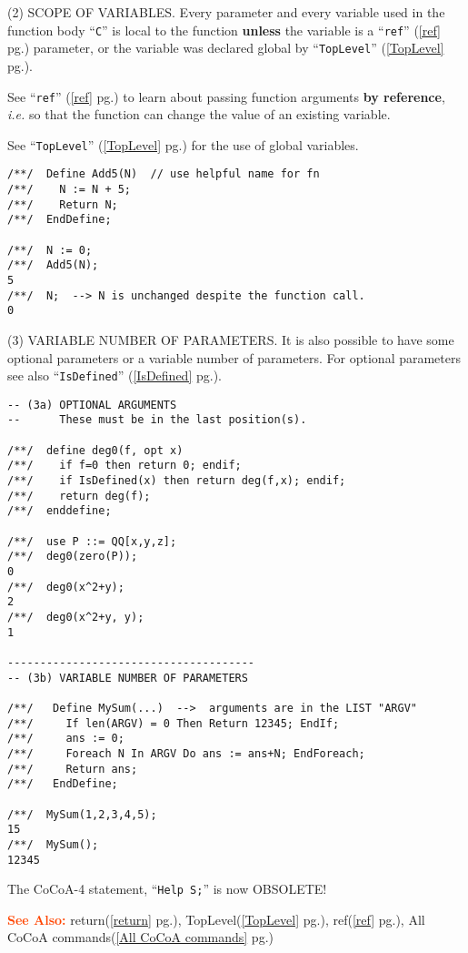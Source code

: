 \documentclass[a4paper]{mybook}
\newenvironment{command}{}{} %
\newcommand\SeeAlso{\par\textcolor{OrangeRed}{\textbf{\large See Also: }}}
\begin{document}
\begin{command}
(2) SCOPE OF VARIABLES.
Every parameter and every variable used in the function body ``\verb&C&'' is
local to the function \textbf{unless} the variable is a ``\verb&ref&'' (\ref{ref} pg.\pageref{ref}) parameter, or
the variable was declared global by ``\verb&TopLevel&'' (\ref{TopLevel} pg.\pageref{TopLevel}).
\par 
See ``\verb&ref&'' (\ref{ref} pg.\pageref{ref}) to learn about passing function arguments \textbf{by reference},
\textit{i.e.} so that the function can change the value of an existing variable.
\par 
See ``\verb&TopLevel&'' (\ref{TopLevel} pg.\pageref{TopLevel}) for the use of global variables.
\begin{Verbatim}[label=example, rulecolor=\color{PineGreen}, frame=single]
/**/  Define Add5(N)  // use helpful name for fn
/**/    N := N + 5;
/**/    Return N;
/**/  EndDefine;

/**/  N := 0;
/**/  Add5(N);
5
/**/  N;  --> N is unchanged despite the function call.
0
\end{Verbatim}


(3) VARIABLE NUMBER OF PARAMETERS.
It is also possible to have some optional parameters or a variable
number of parameters.  For optional parameters see also ``\verb&IsDefined&'' (\ref{IsDefined} pg.\pageref{IsDefined}).
\begin{Verbatim}[label=example, rulecolor=\color{PineGreen}, frame=single]
-- (3a) OPTIONAL ARGUMENTS
--      These must be in the last position(s).

/**/  define deg0(f, opt x)
/**/    if f=0 then return 0; endif;
/**/    if IsDefined(x) then return deg(f,x); endif;
/**/    return deg(f);
/**/  enddefine;

/**/  use P ::= QQ[x,y,z];
/**/  deg0(zero(P));
0
/**/  deg0(x^2+y);
2
/**/  deg0(x^2+y, y);
1

--------------------------------------
-- (3b) VARIABLE NUMBER OF PARAMETERS

/**/   Define MySum(...)  -->  arguments are in the LIST "ARGV"
/**/     If len(ARGV) = 0 Then Return 12345; EndIf;
/**/     ans := 0;
/**/     Foreach N In ARGV Do ans := ans+N; EndForeach;
/**/     Return ans;
/**/   EndDefine;

/**/  MySum(1,2,3,4,5);
15
/**/  MySum();
12345
\end{Verbatim}

The CoCoA-4 statement, ``\verb&Help S;&'' is now OBSOLETE!

\SeeAlso %
  return(\ref{return} pg.\pageref{return}), 
    TopLevel(\ref{TopLevel} pg.\pageref{TopLevel}), 
    ref(\ref{ref} pg.\pageref{ref}), 
    All CoCoA commands(\ref{All CoCoA commands} pg.\pageref{All CoCoA commands})
\end{command} %
\end{document}
